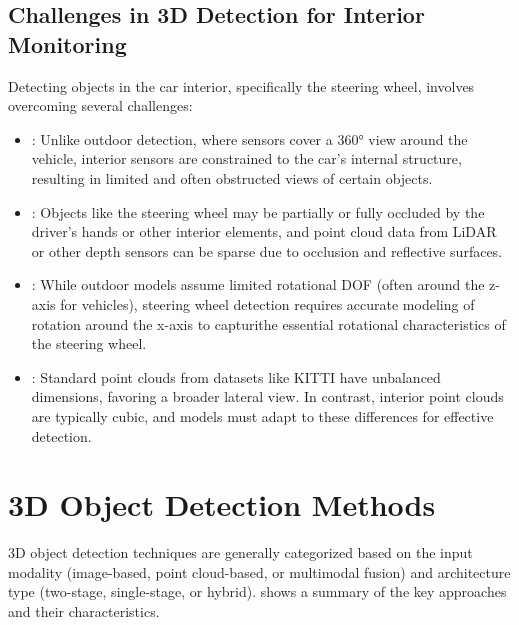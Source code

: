 \subsection{Challenges in 3D Detection for Interior Monitoring}
Detecting objects in the car interior, specifically the steering wheel, 
involves overcoming several challenges:
\begin{itemize}
    \item {}: Unlike outdoor detection, 
    where sensors cover a 360° view around the vehicle, interior sensors 
    are constrained to the car’s internal structure, resulting in 
    limited and often obstructed views of certain objects.
    \item {}: Objects like the steering
    wheel may be partially or fully occluded by the driver’s hands or 
    other interior elements, and point cloud data from LiDAR or other 
    depth sensors can be sparse due to occlusion and reflective surfaces.
    \item {}: While 
    outdoor models assume limited rotational DOF (often around the z-axis for vehicles), 
    steering wheel detection requires accurate modeling of rotation 
    around the x-axis to capturithe essential rotational characteristics 
    of the steering wheel.
    \item {}: Standard point 
    clouds from datasets like KITTI have unbalanced dimensions, favoring 
    a broader lateral view. In contrast, interior point clouds are 
    typically cubic, and models must adapt to these differences for 
    effective detection.
\end{itemize}


\section{3D Object Detection Methods}
3D object detection techniques are generally categorized based on the 
input modality (image-based, point cloud-based, or multimodal fusion) 
and architecture type (two-stage, single-stage, or hybrid). 
 shows a summary of the key approaches and their characteristics.

